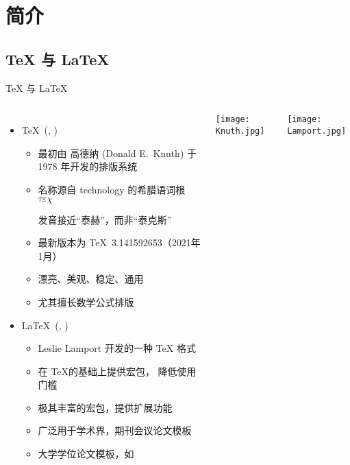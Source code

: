 

\section{简介}

\subsection{\TeX{} 与 \LaTeX{}}

\begin{frame}[fragile]{\TeX{} 与 \LaTeX{}}
  \begin{columns}[T]
    \begin{itemize}
      \item \TeX\ (,
            )
            \begin{itemize}
              \item 最初由 高德纳 (Donald E.~Knuth) 于 1978 年开发的排版系统
              \item 名称源自 technology 的希腊语词根 $\tau\varepsilon\chi$ \par
                    发音接近“泰赫”，而非“泰克斯”
              \item 最新版本为 \TeX\ 3.141592653（2021年1月）
              \item 漂亮、美观、稳定、通用
              \item 尤其擅长数学公式排版
            \end{itemize}
      \item \LaTeX\ (, )
            \begin{itemize}
              \item Leslie Lamport 开发的一种 \TeX{} 格式
              \item 在 \TeX 的基础上提供宏包， 降低使用门槛
              \item 极其丰富的宏包，提供扩展功能
              \item 广泛用于学术界，期刊会议论文模板
              \item 大学学位论文模板，如 \SJTUThesis
            \end{itemize}
    \end{itemize}
    \texttt{[image: Knuth.jpg]}

    \texttt{[image: Lamport.jpg]}
  \end{columns}
\end{frame}

